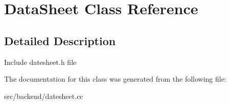 \hypertarget{classDataSheet}{\section{Data\-Sheet Class Reference}
\label{classDataSheet}
}


\subsection{Detailed Description}
Include datesheet.\-h file 

The documentation for this class was generated from the following file\-:\begin{DoxyCompactItemize}
\item 
src/backend/datesheet.\-cc\end{DoxyCompactItemize}
